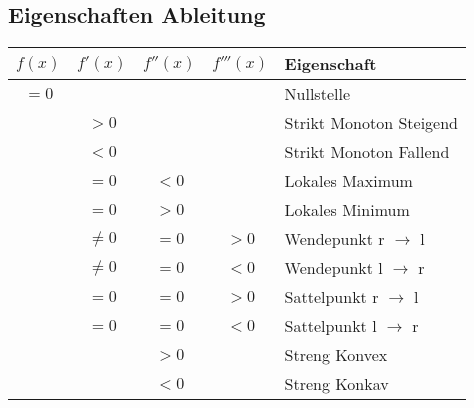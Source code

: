 \subsection{Eigenschaften Ableitung}
\begin{tabular}{c | c | c | c | l}
    $f(x)$           & $f'(x)$  & $f''(x)$ & $ f'''(x)$ & Eigenschaft\\\hline
    $= 0$            &          &          &            & Nullstelle\\\hline
                     & $> 0$    &          &            & Strikt Monoton Steigend\\\hline
                     & $< 0$    &          &            & Strikt Monoton Fallend\\\hline
                     & $= 0$    & $< 0$    &            & Lokales Maximum\\\hline
                     & $= 0$    & $> 0$    &            & Lokales Minimum\\\hline
                     & $\neq 0$ & $= 0$    & $> 0$      & Wendepunkt r $\to$ l\\\hline
                     & $\neq 0$ & $= 0$    & $< 0$      & Wendepunkt l $\to$ r\\\hline
                     & $= 0$    & $= 0$    & $> 0$      & Sattelpunkt r $\to$ l\\\hline
                     & $= 0$    & $= 0$    & $< 0$      & Sattelpunkt l $\to$ r\\\hline
                     &          & $> 0$    &            & Streng Konvex\\\hline
                     &          & $< 0$    &            & Streng Konkav\\\hline
\end{tabular}
